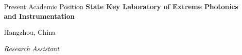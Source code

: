 \begin{rubric}{Present Academic Position}
\entry*[2018/09 -- Present]%
	\textbf{State Key Laboratory of Extreme Photonics and Instrumentation}
	\par Hangzhou, China
	\par \textit{Research Assistant}
\end{rubric}